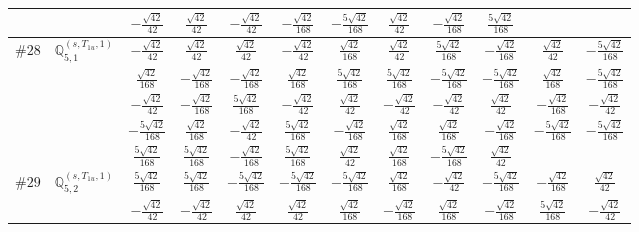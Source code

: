 \documentclass[fleqn,9pt,landscape]{jsarticle}
\begin{document}
\begin{center}
\begin{longtable}{lcccccccccc}
& $ - \frac{\sqrt{42}}{42} $ & $ \frac{\sqrt{42}}{42} $ & $ - \frac{\sqrt{42}}{42} $ & $ - \frac{\sqrt{42}}{168} $ & $ - \frac{5 \sqrt{42}}{168} $ & $ \frac{\sqrt{42}}{42} $ & $ - \frac{\sqrt{42}}{168} $ & $ \frac{5 \sqrt{42}}{168} $ & $  $ & $  $ \\ \hline
$ \#28\quad \mathbb{Q}_{5,1}^{(s,T_{1u},1)} $ & $ - \frac{\sqrt{42}}{42} $ & $ \frac{\sqrt{42}}{42} $ & $ \frac{\sqrt{42}}{42} $ & $ - \frac{\sqrt{42}}{42} $ & $ \frac{\sqrt{42}}{168} $ & $ \frac{\sqrt{42}}{42} $ & $ \frac{5 \sqrt{42}}{168} $ & $ - \frac{\sqrt{42}}{168} $ & $ \frac{\sqrt{42}}{42} $ & $ - \frac{5 \sqrt{42}}{168} $ \\
& $ \frac{\sqrt{42}}{168} $ & $ - \frac{\sqrt{42}}{168} $ & $ - \frac{\sqrt{42}}{168} $ & $ \frac{\sqrt{42}}{168} $ & $ \frac{5 \sqrt{42}}{168} $ & $ \frac{5 \sqrt{42}}{168} $ & $ - \frac{5 \sqrt{42}}{168} $ & $ - \frac{5 \sqrt{42}}{168} $ & $ \frac{\sqrt{42}}{168} $ & $ - \frac{5 \sqrt{42}}{168} $ \\
& $ - \frac{\sqrt{42}}{42} $ & $ - \frac{\sqrt{42}}{168} $ & $ \frac{5 \sqrt{42}}{168} $ & $ - \frac{\sqrt{42}}{42} $ & $ \frac{\sqrt{42}}{42} $ & $ - \frac{\sqrt{42}}{42} $ & $ - \frac{\sqrt{42}}{42} $ & $ \frac{\sqrt{42}}{42} $ & $ - \frac{\sqrt{42}}{168} $ & $ - \frac{\sqrt{42}}{42} $ \\
& $ - \frac{5 \sqrt{42}}{168} $ & $ \frac{\sqrt{42}}{168} $ & $ - \frac{\sqrt{42}}{42} $ & $ \frac{5 \sqrt{42}}{168} $ & $ - \frac{\sqrt{42}}{168} $ & $ \frac{\sqrt{42}}{168} $ & $ \frac{\sqrt{42}}{168} $ & $ - \frac{\sqrt{42}}{168} $ & $ - \frac{5 \sqrt{42}}{168} $ & $ - \frac{5 \sqrt{42}}{168} $ \\
& $ \frac{5 \sqrt{42}}{168} $ & $ \frac{5 \sqrt{42}}{168} $ & $ - \frac{\sqrt{42}}{168} $ & $ \frac{5 \sqrt{42}}{168} $ & $ \frac{\sqrt{42}}{42} $ & $ \frac{\sqrt{42}}{168} $ & $ - \frac{5 \sqrt{42}}{168} $ & $ \frac{\sqrt{42}}{42} $ & $  $ & $  $ \\ \hline
$ \#29\quad \mathbb{Q}_{5,2}^{(s,T_{1u},1)} $ & $ \frac{5 \sqrt{42}}{168} $ & $ \frac{5 \sqrt{42}}{168} $ & $ - \frac{5 \sqrt{42}}{168} $ & $ - \frac{5 \sqrt{42}}{168} $ & $ - \frac{5 \sqrt{42}}{168} $ & $ \frac{\sqrt{42}}{168} $ & $ - \frac{\sqrt{42}}{42} $ & $ - \frac{5 \sqrt{42}}{168} $ & $ - \frac{\sqrt{42}}{168} $ & $ \frac{\sqrt{42}}{42} $ \\
& $ - \frac{\sqrt{42}}{42} $ & $ - \frac{\sqrt{42}}{42} $ & $ \frac{\sqrt{42}}{42} $ & $ \frac{\sqrt{42}}{42} $ & $ \frac{\sqrt{42}}{168} $ & $ - \frac{\sqrt{42}}{168} $ & $ \frac{\sqrt{42}}{168} $ & $ - \frac{\sqrt{42}}{168} $ & $ \frac{5 \sqrt{42}}{168} $ & $ - \frac{\sqrt{42}}{42} $ \\

\end{longtable}
\end{center}
\end{document}
